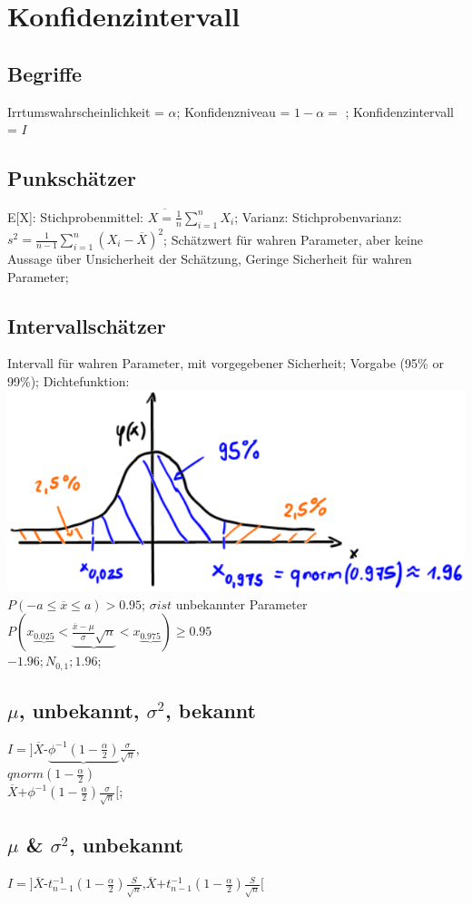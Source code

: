 \section{Konfidenzintervall}
  \subsection{Begriffe}
   Irrtumswahrscheinlichkeit = $ \alpha $; 
  Konfidenzniveau =  $ 1-\alpha = $ ; 
  Konfidenzintervall = $ I $
  \subsection{Punkschätzer}
  E[X]: Stichprobenmittel:
  $ \overline{X = \frac{1}{n}} \sum_{i=1}^{n} X_{i}$; 
  Varianz: Stichprobenvarianz:
  $ s^{2} = \frac{1}{n -1} \sum_{i=1}^{n} (X_{i} - \overline{X})^{2} $; 
  Schätzwert für wahren Parameter, aber keine Aussage über Unsicherheit der Schätzung, Geringe Sicherheit für wahren Parameter; 
  
  \subsection{Intervallschätzer}
  Intervall für wahren Parameter, mit vorgegebener Sicherheit; Vorgabe (95\% or 99\%); 
  Dichtefunktion:
  \includegraphics[scale=0.25]{./pic/KonfidenzintervallDichtefunktion.png}
  $ P(-a \le \overline{x} \le a) > 0.95 $; 
  $ \sigma ist $ unbekannter Parameter\\
  $ P( x_{\underbrace{0.025}} < \underbrace{ \frac{\overline{x} - \mu}{\sigma}\sqrt{n} } < x_{\underbrace{0.975}} ) \ge 0.95 $\\
  $ -1.96; N_{0,1}; 1.96 $; 
  
  \subsection{$ \mu $, unbekannt, $ \sigma^{2} $, bekannt}
  $ I = ] \overline{X} \textbf{-} \underbrace{\phi^{-1}( 1-\frac{\alpha}{2} ) } \frac{\sigma}{ \sqrt{n} }\textbf{,} $\\ 
  $ qnorm ( 1-\frac{\alpha}{2} ) $\\
  $ \overline{X} \textbf{+} \phi^{-1} ( 1- \frac{\alpha}{2} ) \frac{\sigma}{ \sqrt{n} } [ $; 
  \subsection{$ \mu $ \& $ \sigma^{2} $, unbekannt }
  $ I = ] \overline{X} \textbf{-} t_{n-1}^{-1} ( 1-\frac{\alpha}{2} ) \frac{S}{ \sqrt{n} } \textbf{,} \overline{X}  \textbf{+} t_{n-1}^{-1} ( 1-\frac{\alpha}{2} )\frac{S}{ \sqrt{n} } [ $